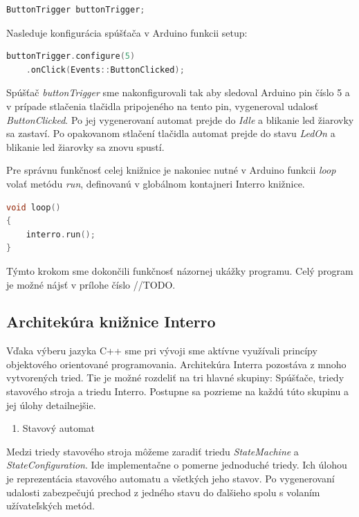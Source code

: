 \begin{lstlisting}[language=c++]  
ButtonTrigger buttonTrigger;            
\end{lstlisting}

Nasleduje konfigurácia spúšťača v Arduino funkcii setup:
\begin{lstlisting}[language=c++]  
buttonTrigger.configure(5)
    .onClick(Events::ButtonClicked); 
\end{lstlisting}

Spúšťač \textit{buttonTrigger} sme nakonfigurovali tak aby sledoval Arduino pin číslo 5 a v prípade stlačenia tlačidla pripojeného na tento pin, vygeneroval udalosť
\textit{ButtonClicked}. Po jej vygenerovaní automat prejde do  \textit{Idle} a blikanie led žiarovky sa zastaví. Po opakovanom stlačení tlačidla automat prejde do
stavu \textit{LedOn} a blikanie led žiarovky sa znovu spustí. \par
Pre správnu funkčnosť celej knižnice je nakoniec nutné v Arduino funkcii \textit{loop} volať metódu \textit{run}, definovanú v globálnom kontajneri Interro knižnice.
\begin{lstlisting}[language=c++]  
void loop()
{
    interro.run();
}
\end{lstlisting}

Týmto krokom sme dokončili funkčnosť názornej ukážky programu. Celý program je možné nájsť v prílohe číslo //TODO.

\subsection{Architekúra knižnice Interro} \label{subsection:architecture-interro}
Vďaka výberu jazyka C++ sme pri vývoji sme aktívne využívali princípy objektového orientované programovania. Architekúra Interra pozostáva z mnoho vytvorených tried.
Tie je možné rozdeliť na tri hlavné skupiny: Spúšťače, triedy stavového stroja a triedu Interro.
Postupne sa pozrieme na každú túto skupinu a jej úlohy detailnejšie. \par
\begin{enumerate}
    \item Stavový automat
\end{enumerate}
Medzi triedy stavového stroja môžeme zaradiť triedu \textit{StateMachine} a \textit{StateConfiguration}. Ide implementačne o pomerne jednoduché triedy. Ich úlohou
je reprezentácia stavového automatu a všetkých jeho stavov. Po vygenerovaní udalosti zabezpečujú prechod z jedného stavu do ďalšieho spolu s volaním užívateľských
metód. \par

